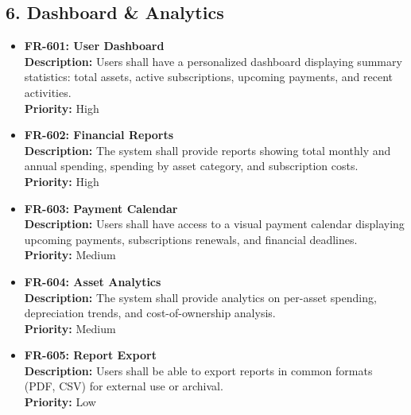 \documentclass[11pt, a4paper]{article}
\newcommand{\reqid}[1]{\textbf{\color{PrimaryColor}#1}}
\begin{document}
	\subsection{6. Dashboard \& Analytics}
	\begin{itemize}
		\item \reqid{FR-601: User Dashboard} \\
		\textbf{Description:} Users shall have a personalized dashboard displaying summary statistics: total assets, active subscriptions, upcoming payments, and recent activities. \\
		\textbf{Priority:} High
		
		\item \reqid{FR-602: Financial Reports} \\
		\textbf{Description:} The system shall provide reports showing total monthly and annual spending, spending by asset category, and subscription costs. \\
		\textbf{Priority:} High
		
		\item \reqid{FR-603: Payment Calendar} \\
		\textbf{Description:} Users shall have access to a visual payment calendar displaying upcoming payments, subscriptions renewals, and financial deadlines. \\
		\textbf{Priority:} Medium
		
		\item \reqid{FR-604: Asset Analytics} \\
		\textbf{Description:} The system shall provide analytics on per-asset spending, depreciation trends, and cost-of-ownership analysis. \\
		\textbf{Priority:} Medium
		
		\item \reqid{FR-605: Report Export} \\
		\textbf{Description:} Users shall be able to export reports in common formats (PDF, CSV) for external use or archival. \\
		\textbf{Priority:} Low
	\end{itemize}
	
\end{document}
